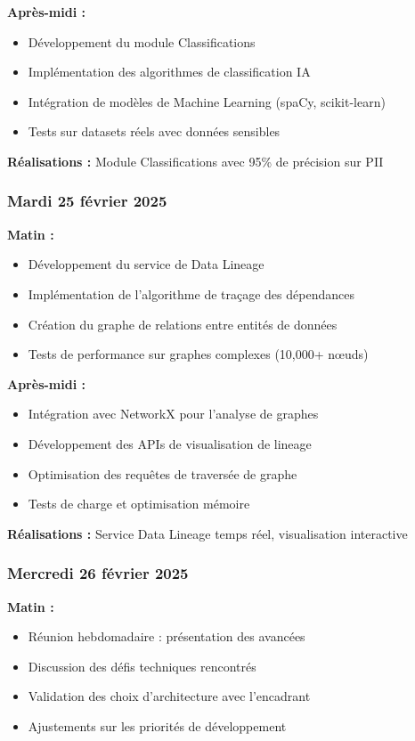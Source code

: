 \documentclass[a4paper,12pt]{article}
\begin{document}
\textbf{Après-midi :}
\begin{itemize}
    \item Développement du module Classifications
    \item Implémentation des algorithmes de classification IA
    \item Intégration de modèles de Machine Learning (spaCy, scikit-learn)
    \item Tests sur datasets réels avec données sensibles
\end{itemize}

\textbf{Réalisations :} Module Classifications avec 95\% de précision sur PII

\subsubsection*{Mardi 25 février 2025}
\textbf{Matin :}
\begin{itemize}
    \item Développement du service de Data Lineage
    \item Implémentation de l'algorithme de traçage des dépendances
    \item Création du graphe de relations entre entités de données
    \item Tests de performance sur graphes complexes (10,000+ nœuds)
\end{itemize}

\textbf{Après-midi :}
\begin{itemize}
    \item Intégration avec NetworkX pour l'analyse de graphes
    \item Développement des APIs de visualisation de lineage
    \item Optimisation des requêtes de traversée de graphe
    \item Tests de charge et optimisation mémoire
\end{itemize}

\textbf{Réalisations :} Service Data Lineage temps réel, visualisation interactive

\subsubsection*{Mercredi 26 février 2025}
\textbf{Matin :}
\begin{itemize}
    \item Réunion hebdomadaire : présentation des avancées
    \item Discussion des défis techniques rencontrés
    \item Validation des choix d'architecture avec l'encadrant
    \item Ajustements sur les priorités de développement
\end{itemize}
\end{document}
